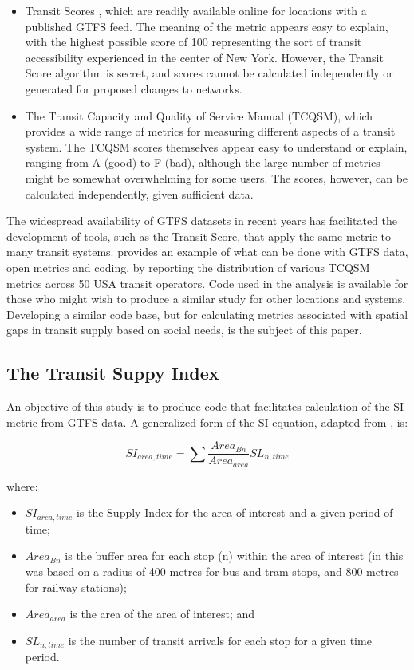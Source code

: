 \documentclass[preprint, 3p,
authoryear]{elsarticle} %
\begin{document}
\begin{itemize}
\item
  Transit Scores \citep{WalkScore:2023tg}, which are readily available
  online for locations with a published GTFS feed. The meaning of the
  metric appears easy to explain, with the highest possible score of 100
  representing the sort of transit accessibility experienced in the
  center of New York. However, the Transit Score algorithm is secret,
  and scores cannot be calculated independently or generated for
  proposed changes to networks.
\item
  The Transit Capacity and Quality of Service Manual (TCQSM), which
  provides a wide range of metrics for measuring different aspects of a
  transit system. The TCQSM scores themselves appear easy to understand
  or explain, ranging from A (good) to F (bad), although the large
  number of metrics might be somewhat overwhelming for some users. The
  scores, however, can be calculated independently, given sufficient
  data.
\end{itemize}

The widespread availability of GTFS datasets in recent years has
facilitated the development of tools, such as the Transit Score, that
apply the same metric to many transit systems. \citet{Wong:2013aa}
provides an example of what can be done with GTFS data, open metrics and
coding, by reporting the distribution of various TCQSM metrics across 50
USA transit operators. Code used in the \citet{Wong:2013aa} analysis is
available for those who might wish to produce a similar study for other
locations and systems. Developing a similar code base, but for
calculating metrics associated with spatial gaps in transit supply based
on social needs, is the subject of this paper.

\hypertarget{the-transit-suppy-index}{%
\subsection{The Transit Suppy Index}\label{the-transit-suppy-index}}

An objective of this study is to produce code that facilitates
calculation of the SI metric from GTFS data. A generalized form of the
SI equation, adapted from \citet{currie2010identifying}, is:

\[SI_{area, time} = \sum{\frac{Area_{Bn}}{Area_{area}}SL_{n, time}}\]

where:

\begin{itemize}
\item
  \(SI_{area, time}\) is the Supply Index for the area of interest and a
  given period of time;
\item
  \(Area_{Bn}\) is the buffer area for each stop (n) within the area of
  interest (in \citet{currie2010identifying} this was based on a radius
  of 400 metres for bus and tram stops, and 800 metres for railway
  stations);
\item
  \(Area_{area}\) is the area of the area of interest; and
\item
  \(SL_{n,time}\) is the number of transit arrivals for each stop for a
  given time period.
\end{itemize}
\end{document}
